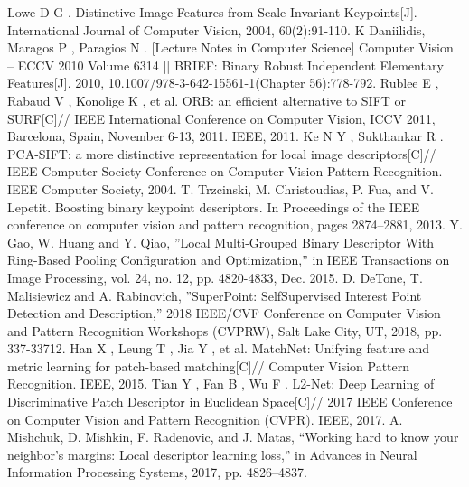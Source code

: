 \documentclass[conference]{IEEEtran}
\begin{document}
\begin{thebibliography}{99}
 Lowe D G . Distinctive Image Features from Scale-Invariant Keypoints[J]. International Journal of Computer Vision, 2004, 60(2):91-110.
 K  Daniilidis,  Maragos P ,  Paragios N . [Lecture Notes in Computer Science] Computer Vision – ECCV 2010 Volume 6314 || BRIEF: Binary Robust Independent Elementary Features[J].  2010, 10.1007/978-3-642-15561-1(Chapter 56):778-792.
 Rublee E ,  Rabaud V ,  Konolige K , et al. ORB: an efficient alternative to SIFT or SURF[C]// IEEE International Conference on Computer Vision, ICCV 2011, Barcelona, Spain, November 6-13, 2011. IEEE, 2011.
 Ke N Y ,  Sukthankar R . PCA-SIFT: a more distinctive representation for local image descriptors[C]// IEEE Computer Society Conference on Computer Vision  Pattern Recognition. IEEE Computer Society, 2004.
 T. Trzcinski, M. Christoudias, P. Fua, and V. Lepetit. Boosting binary keypoint descriptors. In Proceedings of the IEEE conference on computer vision and pattern recognition, pages 2874–2881, 2013.
 Y. Gao, W. Huang and Y. Qiao, ”Local Multi-Grouped Binary Descriptor With Ring-Based Pooling Configuration and Optimization,” in IEEE Transactions on Image Processing, vol. 24, no. 12, pp. 4820-4833, Dec. 2015.
 D. DeTone, T. Malisiewicz and A. Rabinovich, ”SuperPoint: SelfSupervised Interest Point Detection and Description,” 2018 IEEE/CVF Conference on Computer Vision and Pattern Recognition Workshops (CVPRW), Salt Lake City, UT, 2018, pp. 337-33712.
 Han X ,  Leung T ,  Jia Y , et al. MatchNet: Unifying feature and metric learning for patch-based matching[C]// Computer Vision  Pattern Recognition. IEEE, 2015.
 Tian Y ,  Fan B ,  Wu F . L2-Net: Deep Learning of Discriminative Patch Descriptor in Euclidean Space[C]// 2017 IEEE Conference on Computer Vision and Pattern Recognition (CVPR). IEEE, 2017.
 A. Mishchuk, D. Mishkin, F. Radenovic, and J. Matas, “Working hard to know your neighbor’s margins: Local descriptor learning loss,” in Advances in Neural Information Processing Systems, 2017, pp. 4826–4837.


\end{thebibliography}
\end{document}
